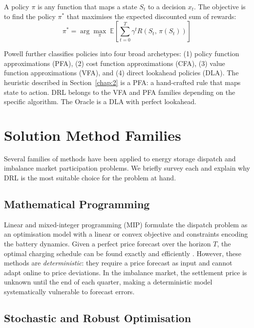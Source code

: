 A policy $\pi$ is any function that maps a state $S_t$ to a decision $x_t$. The objective is to find the policy $\pi^*$ that maximises the expected discounted sum of rewards:
\[
    \pi^* = \arg\max_{\pi}\; \mathbb{E} \left[ \sum_{t=0}^{T} \gamma^t R(S_t,\, \pi(S_t)) \right]
\]

Powell further classifies policies into four broad archetypes: (1) policy function approximations (PFA), (2) cost function approximations (CFA), (3) value function approximations (VFA), and (4) direct lookahead policies (DLA). The heuristic described in Section~\ref{chap:2} is a PFA: a hand-crafted rule that maps state to action. DRL belongs to the VFA and PFA families depending on the specific algorithm. The Oracle is a DLA with perfect lookahead.

\section{Solution Method Families}
\label{sec:solution-families}

Several families of methods have been applied to energy storage dispatch and imbalance market participation problems. We briefly survey each and explain why DRL is the most suitable choice for the problem at hand.

\subsection{Mathematical Programming}

Linear and mixed-integer programming (MIP) formulate the dispatch problem as an optimisation model with a linear or convex objective and constraints encoding the battery dynamics. Given a perfect price forecast over the horizon $T$, the optimal charging schedule can be found exactly and efficiently \cite{[search: mixed-integer programming battery energy storage arbitrage scheduling]}. However, these methods are \textit{deterministic}: they require a price forecast as input and cannot adapt online to price deviations. In the imbalance market, the settlement price is unknown until the end of each quarter, making a deterministic model systematically vulnerable to forecast errors.

\subsection{Stochastic and Robust Optimisation}

